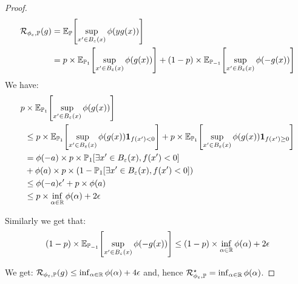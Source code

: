 \begin{proof}
\begin{align*}
\risk_{\phi_\varepsilon,\PP}(g) &= \EE_\PP\left[\sup_{x'\in B_\varepsilon(x)}\phi(yg(x))\right]\\
&=p\times\EE_{\PP_1}\left[\sup_{x'\in B_\varepsilon(x)}\phi(g(x))\right] +(1-p)\times\EE_{\PP_{-1}}\left[\sup_{x'\in B_\varepsilon(x)}\phi(-g(x))\right]
\end{align*}
We have:
\begin{align*}
    p&\times\EE_{\PP_1}\left[\sup_{x'\in B_\varepsilon(x)}\phi(g(x))\right]
    \\
    &\leq p\times\EE_{\PP_1}\left[\sup_{x'\in B_\varepsilon(x)}\phi(g(x))\mathbf{1}_{f(x')<0}\right]+p\times\EE_{\PP_1}\left[\sup_{x'\in B_\varepsilon(x)}\phi(g(x))\mathbf{1}_{f(x')\geq 0}\right] \\
    &=\phi(-a)\times p\times \PP_1\left[\exists x'\in B_\varepsilon(x), f(x')<0\right] \\
    &+ \phi(a)\times p\times\left(1- \PP_1\left[\exists x'\in B_\varepsilon(x), f(x')<0\right]\right)\\
    &\leq\phi(-a) \epsilon'+p\times\phi(a)\\
    &\leq p\times\inf_{\alpha\in\RR}\phi(\alpha) + 2\epsilon
\end{align*}

Similarly we get that:
\begin{align*}
(1-p)\times\EE_{\PP_{-1}}\left[\sup_{x'\in B_\varepsilon(x)}\phi(-g(x))\right] \leq(1-p)\times\inf_{\alpha\in\RR}\phi(\alpha)+2\epsilon
\end{align*}

We get: $\mathcal{R}_{\phi_\varepsilon,\mathbb{P}}(g)\leq \inf_{\alpha\in\mathbb{R}}\phi(\alpha)+4\epsilon$ and, hence $\mathcal{R}^\star_{\phi_\varepsilon,\mathbb{P}}=\inf_{\alpha\in\mathbb{R}}\phi(\alpha)$.
\end{proof}



